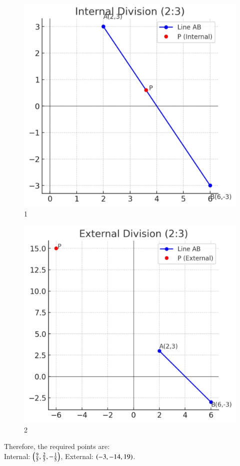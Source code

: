 \documentclass[journal]{IEEEtran}
\begin{document}
\newpage
\begin{figure}[H]
    \centering
    \includegraphics[width=0.5\linewidth]{figs/fig_int_div.jpeg}
    \caption{1}
    \label{fig:1}
\end{figure}
\begin{figure}[H]
    \centering
    \includegraphics[width=0.5\linewidth]{figs/fig_ext_div.jpeg}
    \caption{2}
    \label{fig:2}
\end{figure}
Therefore, the required points are: \\
Internal: $\left(\tfrac{9}{5}, \tfrac{2}{5}, -\tfrac{1}{5}\right)$, \quad 
External: $\left(-3,-14,19\right)$.\\
\end{document}
